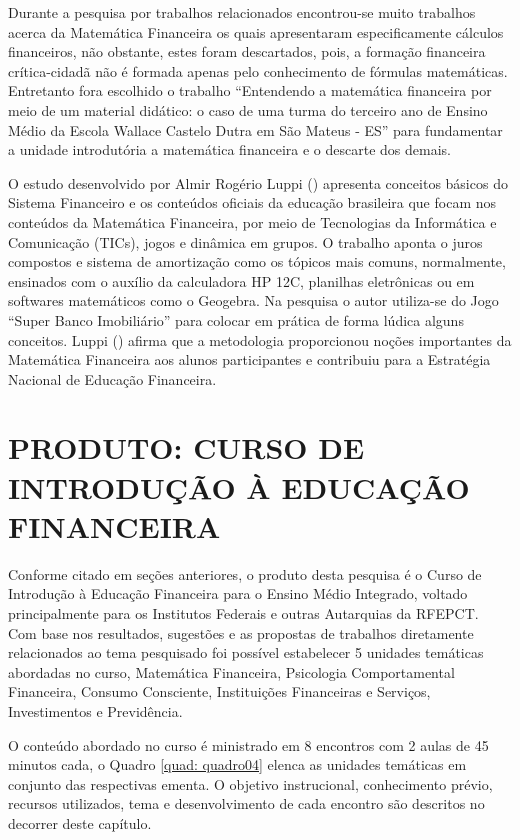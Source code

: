 Durante a pesquisa por trabalhos relacionados encontrou-se muito trabalhos acerca da Matemática Financeira os quais apresentaram especificamente cálculos financeiros, não obstante, estes foram descartados, pois, a formação financeira crítica-cidadã não é formada apenas pelo conhecimento de fórmulas matemáticas. Entretanto fora escolhido o trabalho “Entendendo a matemática financeira por meio de um material didático: o caso de uma turma do terceiro ano de Ensino Médio da Escola Wallace Castelo Dutra em São Mateus - ES” para fundamentar a unidade introdutória a matemática financeira e o descarte dos demais.

O estudo desenvolvido por Almir Rogério Luppi (\citeyear{luppi2018}) apresenta conceitos básicos do Sistema Financeiro e os conteúdos oficiais da educação brasileira que focam nos conteúdos da Matemática Financeira, por meio de Tecnologias da Informática e Comunicação (TICs), jogos e dinâmica em grupos. O trabalho aponta o juros compostos e sistema de amortização como os tópicos mais comuns, normalmente, ensinados com o auxílio da calculadora HP 12C, planilhas eletrônicas ou em softwares matemáticos como o Geogebra. Na pesquisa o autor utiliza-se do Jogo “Super Banco Imobiliário” para colocar em prática de forma lúdica alguns conceitos. Luppi (\citeyear{luppi2018}) afirma que a metodologia proporcionou noções importantes da Matemática Financeira aos alunos participantes e contribuiu para a Estratégia Nacional de Educação Financeira.

\chapter{PRODUTO: CURSO DE INTRODUÇÃO À EDUCAÇÃO FINANCEIRA}
Conforme citado em seções anteriores, o produto desta pesquisa é o Curso de Introdução à Educação Financeira para o Ensino Médio Integrado, voltado principalmente para os Institutos Federais e outras Autarquias da RFEPCT. Com  base nos resultados, sugestões e as propostas de trabalhos diretamente relacionados ao tema pesquisado foi possível estabelecer 5 unidades temáticas abordadas no curso, Matemática Financeira, Psicologia Comportamental Financeira, Consumo Consciente, Instituições Financeiras e Serviços, Investimentos e Previdência.

O conteúdo abordado no curso é ministrado em 8 encontros com 2 aulas de 45 minutos cada, o Quadro \ref{quad: quadro04} elenca as unidades temáticas em conjunto das respectivas ementa. O objetivo instrucional, conhecimento prévio, recursos utilizados, tema e desenvolvimento de cada encontro são descritos no decorrer deste capítulo.

